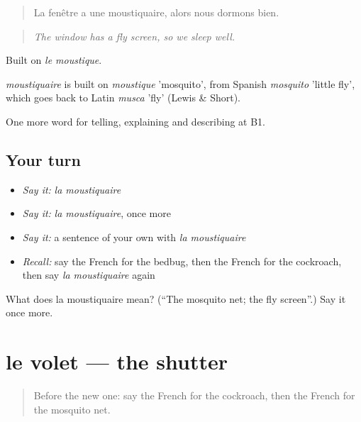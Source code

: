 \begin{quote}
La fenêtre a une moustiquaire, alors nous dormons bien.
\end{quote}

\begin{quote}
\emph{The window has a fly screen, so we sleep well.}
\end{quote}

Built on \emph{le moustique}.

\begin{cousinweb}
\emph{moustiquaire} is built on \emph{moustique} 'mosquito', from Spanish \emph{mosquito} 'little fly', which goes back to Latin \emph{musca} 'fly' (Lewis \& Short).
\end{cousinweb}

\begin{grammarlens}[title={What you've built}]
One more word for telling, explaining and describing at B1.
\end{grammarlens}

\subsection*{Your turn}
\begin{itemize}
\raggedright
  \item \emph{Say it:} \emph{la moustiquaire}
  \item \emph{Say it:} \emph{la moustiquaire}, once more
  \item \emph{Say it:} a sentence of your own with \emph{la moustiquaire}
  \item \emph{Recall:} say the French for the bedbug, then the French for the cockroach, then say \emph{la moustiquaire} again
\end{itemize}

\begin{tcolorbox}[breakable,colback=teal!4,colframe=teal!35!black,title={Before you move on}]
What does la moustiquaire mean? (\textquotedblleft{}The mosquito net; the fly screen\textquotedblright{}.) Say it once more.
\end{tcolorbox}
\section[le volet]{le volet — the shutter}

\label{lesson:FR-C430-volet}



\begin{quote}
Before the new one: say the French for the cockroach, then the French for the mosquito net.
\end{quote}

